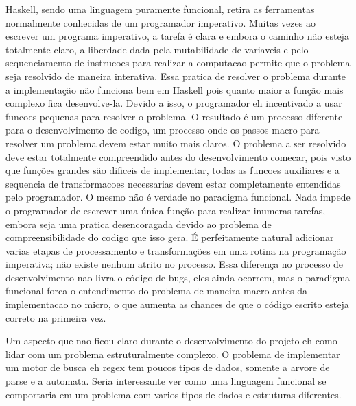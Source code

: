 Haskell, sendo uma linguagem puramente funcional, retira as ferramentas normalmente conhecidas de um programador imperativo.
Muitas vezes ao escrever um programa imperativo, a tarefa é clara e embora o caminho não esteja totalmente claro, a liberdade dada pela mutabilidade de variaveis e pelo sequenciamento de instrucoes para realizar a computacao permite que o problema seja resolvido de maneira interativa.
Essa pratica de resolver o problema durante a implementação não funciona bem em Haskell pois quanto maior a função mais complexo fica desenvolve-la.
Devido a isso, o programador eh incentivado a usar funcoes pequenas para resolver o problema.
O resultado é um processo diferente para o desenvolvimento de codigo, um processo onde os passos macro para resolver um problema devem estar muito mais claros.
O problema a ser resolvido deve estar totalmente compreendido antes do desenvolvimento comecar, pois visto que funções grandes são dificeis de implementar, todas as funcoes auxiliares e a sequencia de transformacoes necessarias devem estar completamente entendidas pelo programador.
O mesmo não é verdade no paradigma funcional.
Nada impede o programador de escrever uma única função para realizar inumeras tarefas, embora seja uma pratica desencoragada devido ao problema de compreensibilidade do codigo que isso gera.
É perfeitamente natural adicionar varias etapas de processamento e transformações em uma rotina na programação imperativa; não existe nenhum atrito no processo.
Essa diferença no processo de desenvolvimento nao livra o código de bugs, eles ainda ocorrem, mas o paradigma funcional forca o entendimento do problema de maneira macro antes da implementacao no micro, o que aumenta as chances de que o código escrito esteja correto na primeira vez.

Um aspecto que nao ficou claro durante o desenvolvimento do projeto eh como lidar com um problema estruturalmente complexo.
O problema de implementar um motor de busca eh regex tem poucos tipos de dados, somente a arvore de parse e a automata.
Seria interessante ver como uma linguagem funcional se comportaria em um problema com varios tipos de dados e estruturas diferentes.
